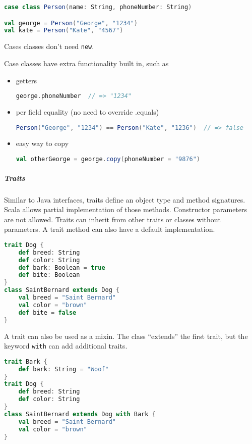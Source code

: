 \begin{lstlisting}[language=scala, style=snippet]
case class Person(name: String, phoneNumber: String)

val george = Person("George", "1234")
val kate = Person("Kate", "4567")
\end{lstlisting}
Cases classes don't need \texttt{new}.

Case classes have extra functionality built in, such as
\begin{itemize}
\item getters
\begin{lstlisting}[language=scala, style=snippet]
george.phoneNumber  // => "1234"
\end{lstlisting}
\item per field equality (no need to override .equals)
\begin{lstlisting}[language=scala, style=snippet]
Person("George", "1234") == Person("Kate", "1236")  // => false
\end{lstlisting}
\item easy way to copy
\begin{lstlisting}[language=scala, style=snippet]
val otherGeorge = george.copy(phoneNumber = "9876")
\end{lstlisting}
\end{itemize}

\subparagraph{Traits}
Similar to Java interfaces, traits define an object type and method signatures. Scala allows partial implementation of those methods. Constructor parameters are not allowed. Traits can inherit from other traits or classes without parameters. A trait method can also have a default implementation.
\begin{lstlisting}[language=scala, style=snippet]
trait Dog {
    def breed: String
    def color: String
    def bark: Boolean = true
    def bite: Boolean
}
class SaintBernard extends Dog {
    val breed = "Saint Bernard"
    val color = "brown"
    def bite = false
}
\end{lstlisting}
A trait can also be used as a mixin. The class ``extends'' the first trait, but the keyword \texttt{with} can add additional traits.
\begin{lstlisting}[language=scala, style=snippet]
trait Bark {
    def bark: String = "Woof"
}
trait Dog {
    def breed: String
    def color: String
}
class SaintBernard extends Dog with Bark {
    val breed = "Saint Bernard"
    val color = "brown"
}
\end{lstlisting}

